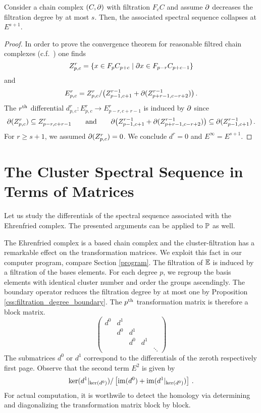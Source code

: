 \begin{lem}
    \label{css:collapsing_ss}
    Consider a chain complex $(C, \del)$ with filtration $F_cC$ and assume $\del$ decreases the filtration degree by at most $s$.
    Then, the associated spectral sequence collapses at $E^{s+1}$.
\end{lem}
\begin{proof}
    In order to prove the convergence theorem for reasonable filtred chain complexes (c.f.\ \cite[Chapter 9, Theorem 2]{Spanier199412}) one finds
    \[
        Z^r_{p,c} = \{ x \in F_pC_{p+c} \mid \del x \in F_{p-r}C_{p+c-1} \}
    \]
    and
    \[
        E^r_{p,c} = Z^r_{p,c} / \big( Z^{r-1}_{p-1,c+1} + \del(Z^{r-1}_{p+r-1,c-r+2})\big) \,.
    \]
    The $r\Th$ differential $d^r_{p,c} \colon E^r_{p,c} \to E^r_{p-r,c+r-1}$ is induced by $\del$ since
    \[
        \del(Z^r_{p,c}) \subseteq Z^r_{p-r,c+r-1} \mspc{and}{20} \del\big( Z^{r-1}_{p-1,c+1} + \del(Z^{r-1}_{p+r-1,c-r+2})\big) \subseteq \del(Z^{r-1}_{p-1,c+1}) \,.
    \]
    For $r \ge s+1$, we assumed $\del(Z^r_{p,c}) = 0$.
    We conclude $d^r = 0$ and $E^\infty = E^{s+1}$.
\end{proof}

\section{The Cluster Spectral Sequence in Terms of Matrices}
\label{css:section_matrix_version}
Let us study the differentials of the spectral sequence associated with the Ehrenfried complex.
The presented arguments can be applied to $\PP$ as well.

The Ehrenfried complex is a based chain complex and the cluster-filtration has a remarkable effect on the transformation matrices.
We exploit this fact in our computer program, compare Section \ref{program}.
The filtration of $\E$ is induced by a filtration of the bases elements.
For each degree $p$, we regroup the basis elements with identical cluster number and order the groups ascendingly.
The boundary operator reduces the filtration degree by at most one by Proposition \ref{css:filtration_degree_boundary}.
The $p\Th$ transformation matrix is therefore a block matrix.
\[ 
    \begin{pmatrix}
        d^0 & d^1 \\
            & d^0   & d^1 \\
            &       & d^0   & d^1 \\
            &       &       &     & \ddots
    \end{pmatrix}
\]    
The submatrices $d^0$ or $d^1$ correspond to the differentials of the zeroth respectively first page.
Observe that the second term $E^2$ is given by
\[
    \ker( d^1|_{\ker(d^0)}) / \left[ \img(d^0) + \img(d^1|_{\ker(d^0)}) \right] \,.
\]
For actual computation, it is worthwile to detect the homology via determining and diagonalizing the transformation matrix block by block.
